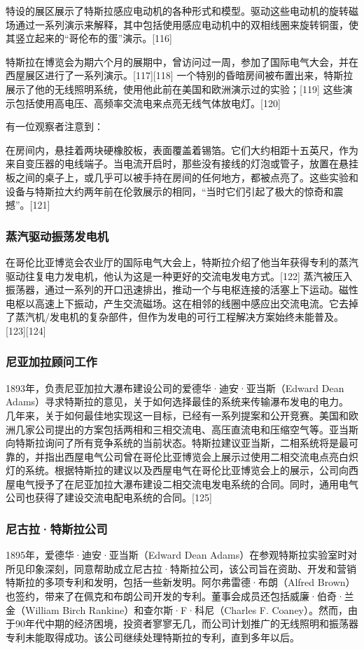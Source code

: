 特设的展区展示了特斯拉感应电动机的各种形式和模型。驱动这些电动机的旋转磁场通过一系列演示来解释，其中包括使用感应电动机中的双相线圈来旋转铜蛋，使其竖立起来的“哥伦布的蛋”演示。[116]

特斯拉在博览会为期六个月的展期中，曾访问过一周，参加了国际电气大会，并在西屋展区进行了一系列演示。[117][118] 一个特别的昏暗房间被布置出来，特斯拉展示了他的无线照明系统，使用他此前在美国和欧洲演示过的实验；[119] 这些演示包括使用高电压、高频率交流电来点亮无线气体放电灯。[120]

有一位观察者注意到：

在房间内，悬挂着两块硬橡胶板，表面覆盖着锡箔。它们大约相距十五英尺，作为来自变压器的电线端子。当电流开启时，那些没有接线的灯泡或管子，放置在悬挂板之间的桌子上，或几乎可以被手持在房间的任何地方，都被点亮了。这些实验和设备与特斯拉大约两年前在伦敦展示的相同，“当时它们引起了极大的惊奇和震撼”。[121]
\subsubsection{蒸汽驱动振荡发电机}  
在哥伦比亚博览会农业厅的国际电气大会上，特斯拉介绍了他当年获得专利的蒸汽驱动往复电力发电机，他认为这是一种更好的交流电发电方式。[122] 蒸汽被压入振荡器，通过一系列的开口迅速排出，推动一个与电枢连接的活塞上下运动。磁性电枢以高速上下振动，产生交流磁场。这在相邻的线圈中感应出交流电流。它去掉了蒸汽机/发电机的复杂部件，但作为发电的可行工程解决方案始终未能普及。[123][124]
\subsubsection{尼亚加拉顾问工作}  
1893年，负责尼亚加拉大瀑布建设公司的爱德华·迪安·亚当斯（Edward Dean Adams）寻求特斯拉的意见，关于如何选择最佳的系统来传输瀑布发电的电力。几年来，关于如何最佳地实现这一目标，已经有一系列提案和公开竞赛。美国和欧洲几家公司提出的方案包括两相和三相交流电、高压直流电和压缩空气等。亚当斯向特斯拉询问了所有竞争系统的当前状态。特斯拉建议亚当斯，二相系统将是最可靠的，并指出西屋电气公司曾在哥伦比亚博览会上展示过使用二相交流电点亮白炽灯的系统。根据特斯拉的建议以及西屋电气在哥伦比亚博览会上的展示，公司向西屋电气授予了在尼亚加拉大瀑布建设二相交流电发电系统的合同。同时，通用电气公司也获得了建设交流电配电系统的合同。[125]
\subsubsection{尼古拉·特斯拉公司} 
1895年，爱德华·迪安·亚当斯（Edward Dean Adams）在参观特斯拉实验室时对所见印象深刻，同意帮助成立尼古拉·特斯拉公司，该公司旨在资助、开发和营销特斯拉的多项专利和发明，包括一些新发明。阿尔弗雷德·布朗（Alfred Brown）也签约，带来了在佩克和布朗公司开发的专利。董事会成员还包括威廉·伯奇·兰金（William Birch Rankine）和查尔斯·F·科尼（Charles F. Coaney）。然而，由于90年代中期的经济困境，投资者寥寥无几，而公司计划推广的无线照明和振荡器专利未能取得成功。该公司继续处理特斯拉的专利，直到多年以后。
